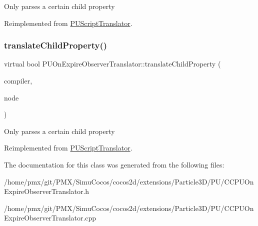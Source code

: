 Only parses a certain child property 

Reimplemented from \hyperlink{classPUScriptTranslator_a0374d83a8a04e57918975d525e0f8fe8}{P\+U\+Script\+Translator}.

\mbox{\label{classPUOnExpireObserverTranslator_aa547f9b3336637066998681d720af51e}} 
\subsubsection{\texorpdfstring{translate\+Child\+Property()}{translateChildProperty()}\hspace{0.1cm}{\footnotesize\ttfamily [2/2]}}
{\footnotesize\ttfamily virtual bool P\+U\+On\+Expire\+Observer\+Translator\+::translate\+Child\+Property (\begin{DoxyParamCaption}\item[{\hyperlink{classPUScriptCompiler}{P\+U\+Script\+Compiler} $\ast$}]{compiler,  }\item[{\hyperlink{classPUAbstractNode}{P\+U\+Abstract\+Node} $\ast$}]{node }\end{DoxyParamCaption})\hspace{0.3cm}{\ttfamily [virtual]}}

Only parses a certain child property 

Reimplemented from \hyperlink{classPUScriptTranslator_a0374d83a8a04e57918975d525e0f8fe8}{P\+U\+Script\+Translator}.



The documentation for this class was generated from the following files\+:\begin{DoxyCompactItemize}
\item 
/home/pmx/git/\+P\+M\+X/\+Simu\+Cocos/cocos2d/extensions/\+Particle3\+D/\+P\+U/C\+C\+P\+U\+On\+Expire\+Observer\+Translator.\+h\item 
/home/pmx/git/\+P\+M\+X/\+Simu\+Cocos/cocos2d/extensions/\+Particle3\+D/\+P\+U/C\+C\+P\+U\+On\+Expire\+Observer\+Translator.\+cpp\end{DoxyCompactItemize}
